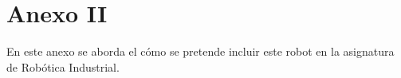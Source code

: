 \chapter*{Anexo II}
\label{cap:anexoii}

En este anexo se aborda el cómo se pretende incluir este robot en la asignatura de Robótica Industrial. 